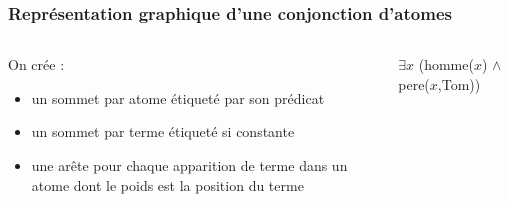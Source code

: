 \begin{frame}
	\frametitle{Représentation graphique d'une conjonction d'atomes}

	\begin{columns}
	
	\begin{column}{0.45\linewidth}
		On crée :
		\begin{itemize}
			\item un sommet par atome étiqueté par son prédicat \checkmark
			\item un sommet par terme étiqueté si constante \checkmark
			\item une arête pour chaque apparition de terme dans un atome 
			dont le poids est la position du terme \checkmark
		\end{itemize}
	\end{column}
	\vline
	\hfill
	\begin{column}{0.45\linewidth}
		$\exists x$ (homme($x$) $\wedge$ pere($x$,Tom))
		\begin{figure}
		\end{figure}
	\end{column}
	\end{columns}
\end{frame}





